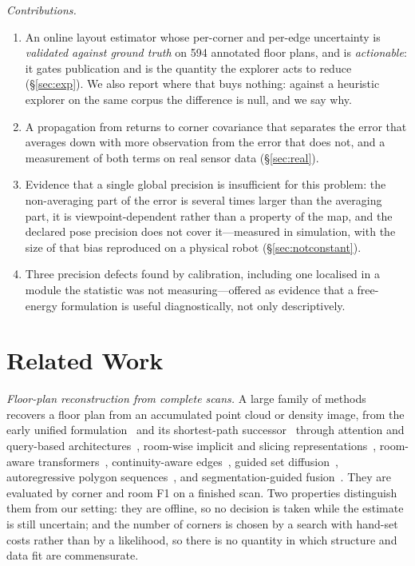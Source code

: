 \documentclass[conference,letterpaper,10pt]{IEEEtran}
\begin{document}
\emph{Contributions.}
\begin{enumerate}
  \item An online layout estimator whose per-corner and per-edge uncertainty is \emph{validated
  against ground truth} on 594 annotated floor plans, and is \emph{actionable}: it gates publication
  and is the quantity the explorer acts to reduce (\S\ref{sec:exp}). We also report where that
  buys nothing: against a heuristic explorer on the same corpus the difference is null, and we say
  why.
  \item A propagation from returns to corner covariance that separates the error that averages down
  with more observation from the error that does not, and a measurement of both terms on real sensor
  data (\S\ref{sec:real}).
  \item Evidence that a single global precision is insufficient for this problem: the non-averaging
  part of the error is several times larger than the averaging part, it is viewpoint-dependent rather
  than a property of the map, and the declared pose precision does not cover it---measured in
  simulation, with the size of that bias reproduced on a physical robot (\S\ref{sec:notconstant}).
  \item Three precision defects found by calibration, including one localised in a module the
  statistic was not measuring---offered as evidence that a free-energy formulation is useful
  diagnostically, not only descriptively.
\end{enumerate}

\section{Related Work}

\emph{Floor-plan reconstruction from complete scans.} A large family of methods recovers a floor
plan from an accumulated point cloud or density image, from the early unified
formulation~\cite{liu2018floornet} and its shortest-path successor~\cite{chenfloorsp} through
attention and query-based architectures~\cite{chen2022heat,yue2023roomformer}, room-wise implicit and
slicing representations~\cite{xufrinet,su2023slibonet}, room-aware
transformers~\cite{liu2024polyroom}, continuity-aware edges~\cite{liu2025cage}, guided set
diffusion~\cite{chen2023polydiffuse}, autoregressive polygon
sequences~\cite{phung2026raster2seq}, and segmentation-guided
fusion~\cite{ye2025floorsam}. They are evaluated by corner and room F1 on a finished scan. Two
properties distinguish them from our setting: they are offline, so no decision is taken while the
estimate is still uncertain; and the number of corners is chosen by a search with hand-set costs
rather than by a likelihood, so there is no quantity in which structure and data fit are commensurate.
\end{document}
